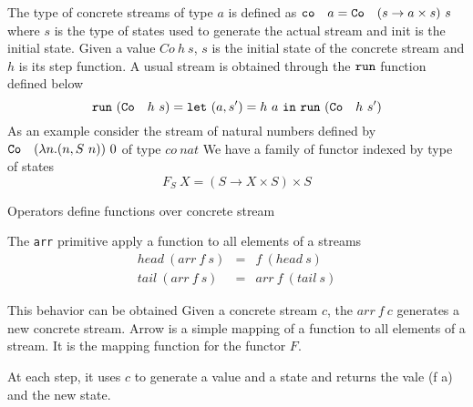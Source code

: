 The type of concrete streams of type \(a\) is defined as 
\({\tt{co}}~\ ~a = {\tt{Co}}~\ ~(s \rightarrow a \times s)\ s\)
where \(s\) is the type of states used to generate the actual stream
and init is the initial state.
Given a value \(Co~h~s\), \(s\) is the initial state of the concrete stream and \(h\) is 
its step function. A usual stream is obtained through the \({\tt{run}}\) function defined below
\begin{equation*}    
    {\tt{run}}\ (\Co\ h\ s) = \letin{(a,s')}{h\ a}{{\tt{run}}\ (\Co\ h\ s')}
\end{equation*}
As an example consider the stream of natural numbers defined by 
\({\tt{Co}}~\ ~(\lambda n.(n,S\ n))\ 0\) of type \(co~nat\)
We have a family of functor indexed by type of states 
    $$F_S~X = (S \rightarrow X \times S) \times S$$

Operators define functions over concrete stream 

The {\tt{arr}} primitive apply a function to all elements of a streams 
$$
\begin{array}{lcl}
    head~(arr~f~s) &=& f~(head~s)\\
    tail~(arr~f~s) &=& arr~f~(tail~ s)
\end{array}
$$

This behavior can be obtained 
Given a concrete stream $c$, the $arr~f~c$ generates a new concrete
stream.
Arrow is a simple mapping of a function to all elements of a stream.
It is the mapping function for the functor $F$.

At each step, it uses $c$ to generate a value and a state 
and returns the vale (f a) and the new state.

